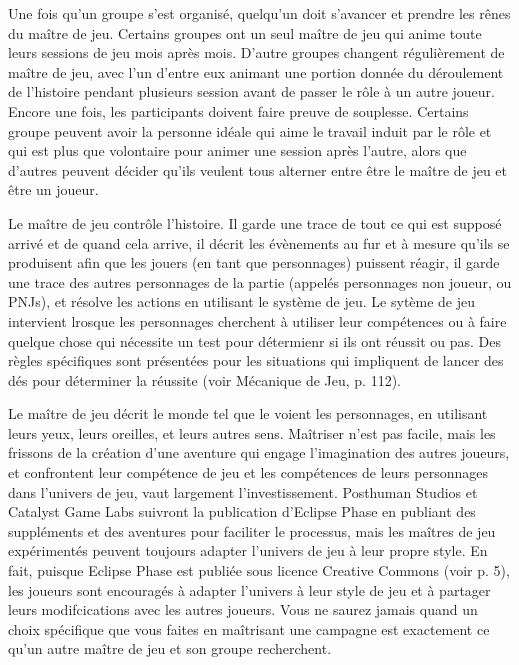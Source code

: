 Une fois qu'un groupe s'est organisé, quelqu'un doit s'avancer et prendre les rênes du maître de jeu. Certains groupes ont un seul maître de jeu qui anime toute leurs sessions de jeu mois après mois. D'autre groupes changent régulièrement de maître de jeu, avec l'un d'entre eux animant une portion donnée du déroulement de l'histoire pendant plusieurs session avant de passer le rôle à un autre joueur. Encore une fois, les participants doivent faire preuve de souplesse. Certains groupe peuvent avoir la personne idéale qui aime le travail induit par le rôle et qui est plus que volontaire pour animer une session après l'autre, alors que d'autres peuvent décider qu'ils veulent tous alterner entre être le maître de jeu et être un joueur. 

Le maître de jeu contrôle l'histoire. Il garde une trace de tout ce qui est supposé arrivé et de quand cela arrive, il décrit les évènements au fur et à mesure qu'ils se produisent afin que les jouers (en tant que personnages) puissent réagir, il garde une trace des autres personnages de la partie (appelés personnages non joueur, ou PNJs), et résolve les actions en utilisant le système de jeu. Le sytème de jeu intervient lrosque les personnages cherchent à utiliser leur compétences ou à faire quelque chose qui nécessite un test pour détermienr si ils ont réussit ou pas. Des règles spécifiques sont présentées pour les situations qui impliquent de lancer des dés pour déterminer la réussite (voir Mécanique de Jeu, p.  112). 

Le maître de jeu décrit le monde tel que le voient les personnages, en utilisant leurs yeux, leurs oreilles, et leurs autres sens. Maîtriser n'est pas facile, mais les frissons de la création d'une aventure qui engage l'imagination des autres joueurs, et confrontent leur compétence de jeu et les compétences de leurs personnages dans l'univers de jeu, vaut largement l'investissement. Posthuman Studios et Catalyst Game Labs suivront la publication d'Eclipse Phase en publiant des suppléments et des aventures pour faciliter le processus, mais les maîtres de jeu expérimentés peuvent toujours adapter l'univers de jeu à leur propre style. En fait, puisque Eclipse Phase est publiée sous licence Creative Commons (voir p. 5), les joueurs sont encouragés à adapter l'univers à leur style de jeu et à partager leurs modifcications avec les autres joueurs. Vous ne saurez jamais quand un choix spécifique que vous faites en maîtrisant une campagne est exactement ce qu'un autre maître de jeu et son groupe recherchent. 

